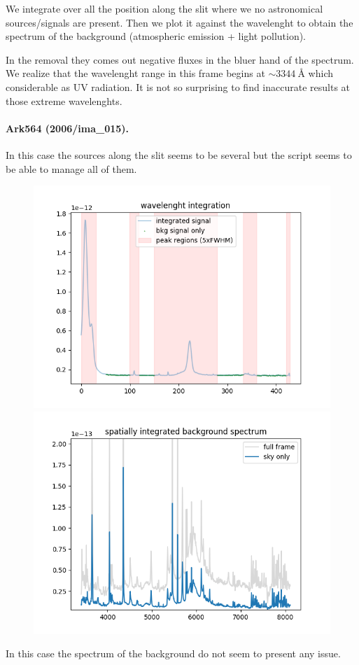 \documentclass{article}
\begin{document}
We integrate over all the position along the slit where we no astronomical sources/signals are present. Then we plot it against the wavelenght to obtain the spectrum of the background (atmospheric emission + light pollution).

In the removal they comes out negative fluxes in the bluer hand of the spectrum. We realize that the wavelenght range in this frame begins at $\sim\SI{3344}{\angstrom}$ which considerable as UV radiation. It is not so surprising to find inaccurate results at those extreme wavelenghts.


\paragraph{Ark564 (2006/ima\_015).} In this case the sources along the slit seems to be several but the script seems to be able to manage all of them.
\begin{figure}[h!]
	\begin{minipage}{.49\textwidth}
		\centering
		\includegraphics[width=\textwidth]{15_1}
	\end{minipage}
	\hfill
	\begin{minipage}{.49\textwidth}
		\centering
		\includegraphics[width=\textwidth]{15_2}
	\end{minipage}
\end{figure}
In this case the spectrum of the background do not seem to present any issue.
\end{document}
